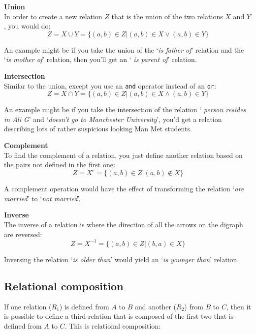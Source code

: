\begin{description}
	\item {\bf Union}\\
		In order to create a new relation $Z$ that is the union of the two
		relations $X$ and $Y$, you would do:
		\[
			Z = X \cup Y = \{(a,b) \in Z | (a,b) \in X \vee (a,b) \in Y\}
		\]

		An example might be if you take the union of the `{\it is father of}'
		relation and the `{\it is mother of}' relation, then you'll get an `{\it
		is parent of}' relation.

	\item {\bf Intersection}\\
		Similar to the union, except you use an {\tt and} operator instead of an
		{\tt or}:
		\[
			Z = X \cap Y = \{(a,b) \in Z | (a,b) \in X \wedge (a,b) \in Y\}
		\]

		An example might be if you take the intersection of the relation `{\it
		person resides in Ali G}' and `{\it doesn't go to Manchester
		University}', you'd get a relation describing lots of rather suspicious
		looking Man Met students.

	\item {\bf Complement}\\
		To find the complement of a relation, you just define another relation
		based on the pairs not defined in the first one:
		\[
			Z = X^c = \{(a,b) \in Z | (a,b) \not\in X\}
		\]

		A complement operation would have the effect of transforming the
		relation `{\it are married}' to `{\it not married}'.

	\item {\bf Inverse}\\
		The inverse of a relation is where the direction of all the arrows on
		the digraph are reversed:
		\[
			Z = X^{-1} = \{(a,b) \in Z | (b,a) \in X\}
		\]

		Inversing the relation `{\it is older than}' would yield an `{\it is
		younger than}' relation.

\end{description}

\subsection{Relational composition}

If one relation ($R_1$) is defined from $A$ to $B$ and another ($R_2$) from $B$
to $C$, then it is possible to define a third relation that is composed of the
first two that is defined from $A$ to $C$. This is relational composition:

